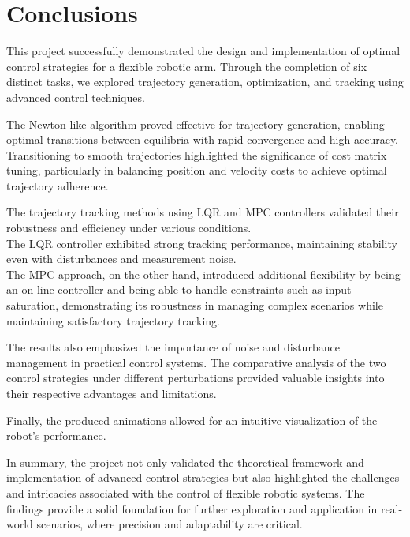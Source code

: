 \documentclass[a4paper,11pt,oneside]{book}
\begin{document}
\chapter*{Conclusions}
\begin{justify}
This project successfully demonstrated the design and implementation of optimal control strategies for a flexible robotic arm. Through the completion of six distinct tasks, we explored trajectory generation, optimization, and tracking using advanced control techniques.

The Newton-like algorithm proved effective for trajectory generation, enabling optimal transitions between equilibria with rapid convergence and high accuracy. Transitioning to smooth trajectories highlighted the significance of cost matrix tuning, particularly in balancing position and velocity costs to achieve optimal trajectory adherence.

The trajectory tracking methods using LQR and MPC controllers validated their robustness and efficiency under various conditions.\\ The LQR controller exhibited strong tracking performance, maintaining stability even with disturbances and measurement noise.\\ The MPC approach, on the other hand, introduced additional flexibility by being an on-line controller and being able to handle constraints such as input saturation, demonstrating its robustness in managing complex scenarios while maintaining satisfactory trajectory tracking.

The results also emphasized the importance of noise and disturbance management in practical control systems. The comparative analysis of the two control strategies under different perturbations provided valuable insights into their respective advantages and limitations.

Finally, the produced animations allowed for an intuitive visualization of the robot's performance.

In summary, the project not only validated the theoretical framework and implementation of advanced control strategies but also highlighted the challenges and intricacies associated with the control of flexible robotic systems. The findings provide a solid foundation for further exploration and application in real-world scenarios, where precision and adaptability are critical.
\end{justify}
\end{document}
